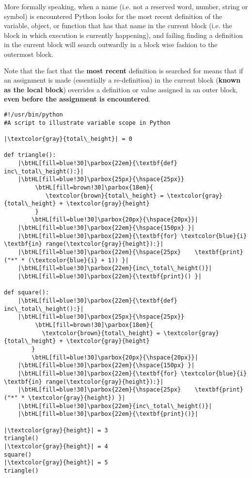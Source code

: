 More formally speaking,   when a name (i.e. not a reserved word, number, string or symbol) is   encountered Python looks for the most recent definition of the   variable, object, or function that has that name in the current block   (i.e. the block in which execution is currently happening), and failing   finding a definition in the current block will search outwardly in a   block wise fashion to the outermost block.

Note that the fact that the \textbf{most recent} definition   is searched for means that if an assignment is made (essentially a   re-definition) in the current block (\textbf{known as the local   block}) overrides a definition or value assigned in an outer   block, \textbf{even before the assignment is encountered}. \\

\begin{lstlisting}[mathescape,escapechar=|]
#!/usr/bin/python 
#A script to illustrate variable scope in Python 

|\textcolor{gray}{total\_height}| = 0

def triangle(): 
    |\btHL[fill=blue!30]\parbox{22em}{\textbf{def} inc\_total\_height():}|
    |\btHL[fill=blue!30]\parbox{25px}{\hspace{25px}}
         \btHL[fill=brown!30]\parbox{18em}{
            \textcolor{brown}{total\_height} = \textcolor{gray}{total\_height} + \textcolor{gray}{height}
         }
        \btHL[fill=blue!30]\parbox{20px}{\hspace{20px}}|
    |\btHL[fill=blue!30]\parbox{22em}{\hspace{150px} }|
    |\btHL[fill=blue!30]\parbox{22em}{\textbf{for} \textcolor{blue}{i} \textbf{in} range(\textcolor{gray}{height}):}|
    |\btHL[fill=blue!30]\parbox{22em}{\hspace{25px}    \textbf{print}("*" * (\textcolor{blue}{i} + 1)) }|
    |\btHL[fill=blue!30]\parbox{22em}{inc\_total\_height()}|
    |\btHL[fill=blue!30]\parbox{22em}{\textbf{print}() }|

def square():
    |\btHL[fill=blue!30]\parbox{22em}{\textbf{def} inc\_total\_height():}|
    |\btHL[fill=blue!30]\parbox{25px}{\hspace{25px}}
         \btHL[fill=brown!30]\parbox{18em}{
           \textcolor{brown}{total\_height} = \textcolor{gray}{total\_height} + \textcolor{gray}{height}
        }
        \btHL[fill=blue!30]\parbox{20px}{\hspace{20px}}|
    |\btHL[fill=blue!30]\parbox{22em}{\hspace{150px} }|
    |\btHL[fill=blue!30]\parbox{22em}{\textbf{for} \textcolor{blue}{i} \textbf{in} range(\textcolor{gray}{height}):}|
    |\btHL[fill=blue!30]\parbox{22em}{\hspace{25px}    \textbf{print}("*" * \textcolor{gray}{height}) }|
    |\btHL[fill=blue!30]\parbox{22em}{inc\_total\_height()}|
    |\btHL[fill=blue!30]\parbox{22em}{\textbf{print}()}| 

|\textcolor{gray}{height}| = 3
triangle()
|\textcolor{gray}{height}| = 4
square()
|\textcolor{gray}{height}| = 5
triangle()
\end{lstlisting}

